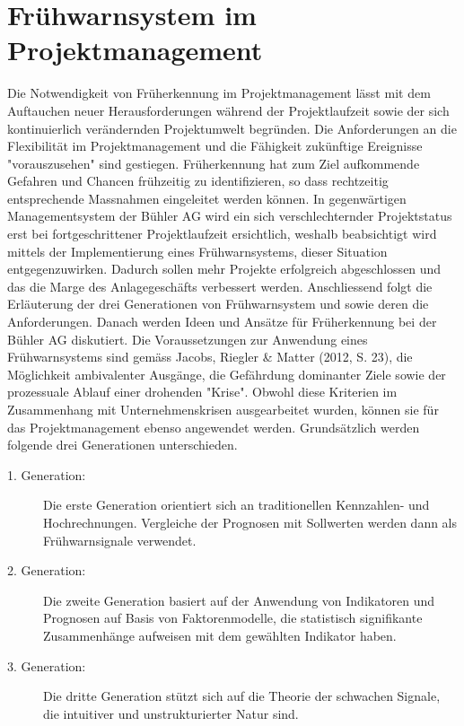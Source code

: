 \section{Frühwarnsystem im Projektmanagement}
Die Notwendigkeit von Früherkennung im Projektmanagement lässt mit dem Auftauchen neuer Herausforderungen während der Projektlaufzeit sowie der sich kontinuierlich verändernden Projektumwelt begründen. Die Anforderungen an die Flexibilität im Projektmanagement und die Fähigkeit zukünftige Ereignisse "vorauszusehen" sind gestiegen. Früherkennung hat zum Ziel aufkommende Gefahren und Chancen frühzeitig zu identifizieren, so dass rechtzeitig entsprechende Massnahmen eingeleitet werden können. In gegenwärtigen Managementsystem der Bühler AG wird ein sich verschlechternder Projektstatus erst bei fortgeschrittener Projektlaufzeit ersichtlich, weshalb beabsichtigt wird mittels der Implementierung eines Frühwarnsystems, dieser Situation entgegenzuwirken. Dadurch sollen mehr Projekte erfolgreich abgeschlossen und das die Marge des Anlagegeschäfts verbessert werden. Anschliessend folgt die Erläuterung der drei Generationen von Frühwarnsystem und sowie deren die Anforderungen. Danach werden Ideen und Ansätze für Früherkennung bei der Bühler AG diskutiert.
Die Voraussetzungen zur Anwendung eines Frühwarnsystems sind gemäss Jacobs, Riegler \& Matter (2012, S. 23), die Möglichkeit ambivalenter Ausgänge, die Gefährdung dominanter Ziele sowie der prozessuale Ablauf einer drohenden "Krise". Obwohl diese Kriterien im Zusammenhang mit Unternehmenskrisen ausgearbeitet wurden, können sie für das Projektmanagement ebenso angewendet werden. Grundsätzlich werden folgende drei Generationen unterschieden.
\begin{description}
	\item[1. Generation:] Die erste Generation orientiert sich an traditionellen Kennzahlen- und Hochrechnungen. Vergleiche der Prognosen mit Sollwerten werden dann als Frühwarnsignale verwendet.
	\item[2. Generation:] Die zweite Generation basiert auf der Anwendung von Indikatoren und Prognosen auf Basis von Faktorenmodelle, die statistisch signifikante Zusammenhänge aufweisen mit dem gewählten Indikator haben.
	\item[3. Generation:] Die dritte Generation stützt sich auf die Theorie der schwachen Signale, die intuitiver und unstrukturierter Natur sind. 
\end{description}
